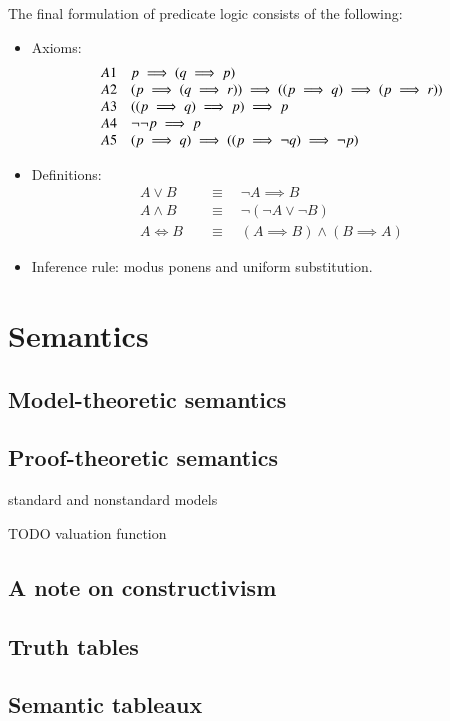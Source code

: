 The final formulation of predicate logic consists of the following:
\begin{itemize}
\item Axioms:
\[ \begin{array}{l l}
A1 & p\implies (q \implies p) \\
A2 & (p\implies (q \implies r))\implies((p\implies q)\implies (p\implies r)) \\
A3 & ((p\implies q)\implies p)\implies p \\
A4 & \neg \neg p \implies p \\
A5 & (p\implies q)\implies ((p\implies \neg q)\implies \neg p)
\end{array} \]
\item Definitions:
\begin{align*}
A \lor B &\quad\equiv\quad \neg A \implies B \\
A \land B &\quad\equiv\quad \neg(\neg A\lor \neg B) \\
A \iff B &\quad\equiv\quad (A\implies B)\land(B\implies A)
\end{align*}
\item Inference rule: modus ponens and uniform substitution.
\end{itemize}

\section{Semantics}
\subsection{Model-theoretic semantics}
\subsection{Proof-theoretic semantics}

standard and nonstandard models

TODO valuation function

\subsection{A note on constructivism}

\subsection{Truth tables}
\subsection{Semantic tableaux}
